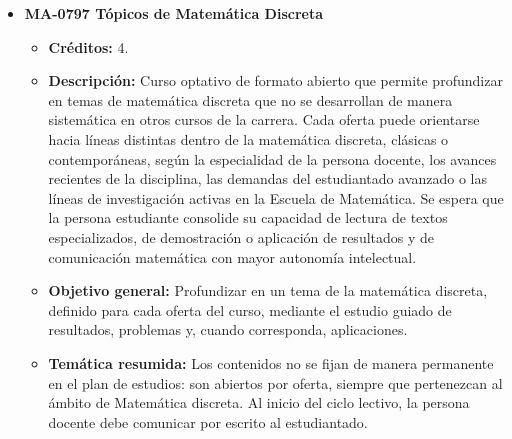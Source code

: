 \begin{itemize}[leftmargin=1.3em, itemsep=10pt, topsep=4pt, label={\color{Azul-UCR}$\blacksquare$}]
\item {\color{Azul-UCR}\textbf{MA-0797 Tópicos de Matemática Discreta}}\par\nopagebreak\smallskip
\begin{itemize}[leftmargin=1.1em, itemsep=3pt, topsep=2pt, parsep=2pt, label={\textendash}]
\item \textbf{Créditos:} 4.
\item \textbf{Descripción:} Curso optativo de formato abierto que permite profundizar en temas de matemática discreta que no se desarrollan de manera sistemática en otros cursos de la carrera. Cada oferta puede orientarse hacia líneas distintas dentro de la matemática discreta, clásicas o contemporáneas, según la especialidad de la persona docente, los avances recientes de la disciplina, las demandas del estudiantado avanzado o las líneas de investigación activas en la Escuela de Matemática. Se espera que la persona estudiante consolide su capacidad de lectura de textos especializados, de demostración o aplicación de resultados y de comunicación matemática con mayor autonomía intelectual.
\item \textbf{Objetivo general:} Profundizar en un tema de la matemática discreta, definido para cada oferta del curso, mediante el estudio guiado de resultados, problemas y, cuando corresponda, aplicaciones.
\item \textbf{Temática resumida:} Los contenidos no se fijan de manera permanente en el plan de estudios: son abiertos por oferta, siempre que pertenezcan al ámbito de Matemática discreta. Al inicio del ciclo lectivo, la persona docente debe comunicar por escrito al estudiantado.
\end{itemize}


\end{itemize}
